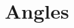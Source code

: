 \documentclass[12pt]{article}
\begin{document}

\newtheorem{Definition}{Définition}
\newtheorem{Theorem}{Théorème}
\newtheorem{Proposition}{Propriété}

\renewcommand{\labelitemi}{$\bullet$}
\renewcommand{\labelitemii}{$\circ$}

\section*{Angles}
\end{document}
